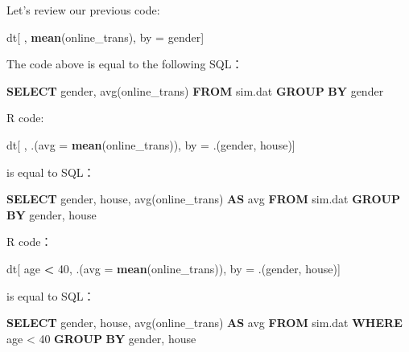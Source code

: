 \documentclass[12pt,]{krantz}
\makeatletter
\newenvironment{Shaded}{\begin{snugshade}}{\end{snugshade}}
\newcommand{\DataTypeTok}[1]{\textcolor[rgb]{0.27,0.27,0.27}{#1}}
\newcommand{\DecValTok}[1]{\textcolor[rgb]{0.06,0.06,0.06}{#1}}
\newcommand{\FunctionTok}[1]{\textcolor[rgb]{0,0,0}{#1}}
\newcommand{\KeywordTok}[1]{\textcolor[rgb]{0.27,0.27,0.27}{\textbf{#1}}}
\newcommand{\NormalTok}[1]{#1}
\newcommand{\OperatorTok}[1]{\textcolor[rgb]{0.43,0.43,0.43}{\textbf{#1}}}
\newcommand{\StringTok}[1]{\textcolor[rgb]{0.5,0.5,0.5}{#1}}
\newenvironment{kframe}{%
\medskip{}
\setlength{\fboxsep}{.8em}
 \def\at@end@of@kframe{}%
 \ifinner\ifhmode%
  \def\at@end@of@kframe{\end{minipage}}%
  \begin{minipage}{\columnwidth}%
 \fi\fi%
 \def\FrameCommand##1{\hskip\@totalleftmargin \hskip-\fboxsep
 \colorbox{shadecolor}{##1}\hskip-\fboxsep
     \hskip-\linewidth \hskip-\@totalleftmargin \hskip\columnwidth}%
 \MakeFramed {\advance\hsize-\width
   \@totalleftmargin\z@ \linewidth\hsize
   \@setminipage}}%
 {\par\unskip\endMakeFramed%
 \at@end@of@kframe}
\renewenvironment{Shaded}{\begin{kframe}}{\end{kframe}}
\makeatother
\begin{document}
Let's review our previous code:

\begin{Shaded}
\begin{Highlighting}[]
\NormalTok{dt[ , }\KeywordTok{mean}\NormalTok{(online_trans), by =}\StringTok{ }\NormalTok{gender]}
\end{Highlighting}
\end{Shaded}

The code above is equal to the following SQL：

\begin{Shaded}
\begin{Highlighting}[]
\KeywordTok{SELECT}\NormalTok{  gender, }\FunctionTok{avg}\NormalTok{(online_trans) }\KeywordTok{FROM}\NormalTok{ sim.dat }\KeywordTok{GROUP} \KeywordTok{BY}\NormalTok{ gender}
\end{Highlighting}
\end{Shaded}

R code:

\begin{Shaded}
\begin{Highlighting}[]
\NormalTok{dt[ , .(}\DataTypeTok{avg =} \KeywordTok{mean}\NormalTok{(online_trans)), by =}\StringTok{ }\NormalTok{.(gender, house)]}
\end{Highlighting}
\end{Shaded}

is equal to SQL：

\begin{Shaded}
\begin{Highlighting}[]
\KeywordTok{SELECT}\NormalTok{ gender, house, }\FunctionTok{avg}\NormalTok{(online_trans) }\KeywordTok{AS} \FunctionTok{avg} \KeywordTok{FROM}\NormalTok{ sim.dat }\KeywordTok{GROUP} \KeywordTok{BY}\NormalTok{ gender, house}
\end{Highlighting}
\end{Shaded}

R code：

\begin{Shaded}
\begin{Highlighting}[]
\NormalTok{dt[ age }\OperatorTok{<}\StringTok{ }\DecValTok{40}\NormalTok{, .(}\DataTypeTok{avg =} \KeywordTok{mean}\NormalTok{(online_trans)), by =}\StringTok{ }\NormalTok{.(gender, house)]}
\end{Highlighting}
\end{Shaded}

is equal to SQL：

\begin{Shaded}
\begin{Highlighting}[]
\KeywordTok{SELECT}\NormalTok{ gender, house, }\FunctionTok{avg}\NormalTok{(online_trans) }\KeywordTok{AS} \FunctionTok{avg} \KeywordTok{FROM}\NormalTok{ sim.dat }\KeywordTok{WHERE}\NormalTok{ age < }\DecValTok{40} \KeywordTok{GROUP} \KeywordTok{BY}\NormalTok{ gender, house}
\end{Highlighting}
\end{Shaded}
\end{document}
